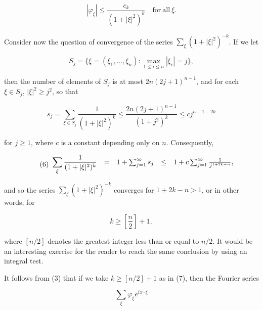 \begin{equation}
\tag{3}\label{eq:6.16:3}
|\varphi_{\xi}|\leq\frac{c_{k}}{(1+|\xi|^{2})^{k}}\quad\mathrm{for\ all}\ \xi.
\end{equation}

Consider now the question of convergence of the series  $ \sum_{\xi} (1 + |\xi|^2)^{-k} $. If we let

\begin{equation}
\tag{4}\label{eq:6.16:4}
S_{j}=\Big\{\xi=(\xi_{1},\ldots,\xi_{n})\colon\max_{1\leq i\leq n}|\xi_{i}|=j\Big\},
\end{equation}

then the number of elements of $S_j$ is at most $2n(2j+1)^{n-1}$, and for each $\xi \in S_j$, $|\xi|^2 \geq j^2$, so that

\begin{equation}
\tag{5}\label{eq:6.16:5}
s_{j}=\sum_{\xi\in S_{j}}\frac{1}{(1+|\xi|^{2})^{k}}\leq\frac{2n(2j+1)^{n-1}}{(1+j^{2})^{k}}\leq c j^{n-1-2k}
\end{equation}

for $j \geq 1$, where $c$ is a constant depending only on $n$. Consequently,

\begin{equation}
\tag{6}\label{eq:6.16:6}
\begin{array}{r c c c l}{\displaystyle\sum_{\xi}\frac{1}{(1+|\xi|^{2})^{k}}}&{=}&{1+\sum_{j=1}^{\infty}s_{j}}&{\leq}&{1+c\sum_{j=1}^{\infty}\frac{1}{j^{1+2k-n}},}\\ \end{array}
\end{equation}

and so the series  $ \sum_{\xi} (1 + |\xi|^{2})^{-k} $ converges for  $ 1 + 2k - n > 1 $, or in other words, for

\begin{equation}
\tag{7}\label{eq:6.16:7}
k\geq\left[\frac{n}{2}\right]+1,
\end{equation}

where  $ [n/2] $ denotes the greatest integer less than or equal to $n/2$. It would be an interesting exercise for the reader to reach the same conclusion by using an integral test.

It follows from (3) that if we take  $ k \geq [n/2] + 1 $ as in (7), then the Fourier series

\begin{equation}
\tag{8}\label{eq:6.16:8}
\sum_{\xi}\varphi_{\xi}e^{ix\cdot\xi}
\end{equation}

